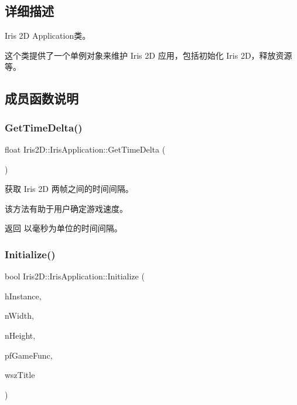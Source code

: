 \subsection{详细描述}
Iris 2D Application类。 

这个类提供了一个单例对象来维护 Iris 2D 应用，包括初始化 Iris 2\+D，释放资源等。 

\subsection{成员函数说明}
\mbox{\label{class_iris2_d_1_1_iris_application_a3b8f4de1902aeda08acbe243aad34f15}} 
\subsubsection{\texorpdfstring{Get\+Time\+Delta()}{GetTimeDelta()}}
{\footnotesize\ttfamily float Iris2\+D\+::\+Iris\+Application\+::\+Get\+Time\+Delta (\begin{DoxyParamCaption}{ }\end{DoxyParamCaption})}



获取 Iris 2D 两帧之间的时间间隔。 

该方法有助于用户确定游戏速度。 \begin{DoxyReturn}{返回}
以毫秒为单位的时间间隔。 
\end{DoxyReturn}
\mbox{\label{class_iris2_d_1_1_iris_application_a84f3ddebb3a3ffb0c172bd41fb952e1a}} 
\subsubsection{\texorpdfstring{Initialize()}{Initialize()}\hspace{0.1cm}{\footnotesize\ttfamily [1/2]}}
{\footnotesize\ttfamily bool Iris2\+D\+::\+Iris\+Application\+::\+Initialize (\begin{DoxyParamCaption}\item[{H\+I\+N\+S\+T\+A\+N\+CE}]{h\+Instance,  }\item[{unsigned int}]{n\+Width,  }\item[{unsigned int}]{n\+Height,  }\item[{\hyperlink{class_iris2_d_1_1_iris_application_ac74720e6cd3a1968f73e92ea99675884}{Game\+Func}}]{pf\+Game\+Func,  }\item[{const std\+::wstring \&}]{wsz\+Title }\end{DoxyParamCaption})}



